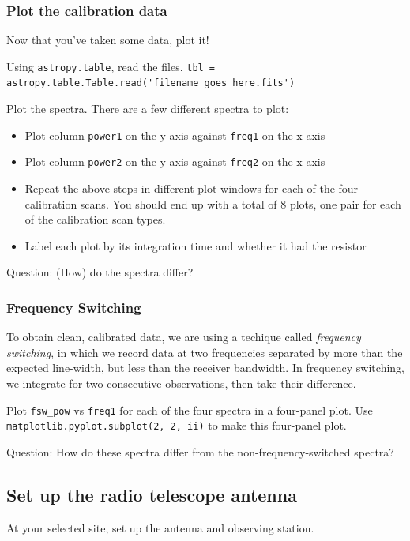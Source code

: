 \documentclass[11pt]{article}
\begin{document}
\subsubsection{Plot the calibration data}
Now that you've taken some data, plot it!

Using \texttt{astropy.table}, read the files.
\verb|tbl = astropy.table.Table.read('filename_goes_here.fits')|

Plot the spectra.  There are a few different spectra to plot:
\begin{itemize}
    \item Plot column \verb|power1| on the y-axis against \verb|freq1| on the x-axis
    \item Plot column \verb|power2| on the y-axis against \verb|freq2| on the x-axis
    \item Repeat the above steps in different plot windows for each of the four
        calibration scans.  You should end up with a total of 8 plots, one pair for
        each of the calibration scan types.
    \item Label each plot by its integration time and whether it had the resistor
\end{itemize}

Question: (How) do the spectra differ?

\subsubsection{Frequency Switching}
\label{sec:fsw}
To obtain clean, calibrated data, we are using a techique called \emph{frequency switching},
in which we record data at two frequencies separated by more than the expected line-width,
but less than the receiver bandwidth.  In frequency switching, we integrate for two consecutive
observations, then take their difference.

Plot \verb|fsw_pow| vs \verb|freq1| for each of the four spectra in a four-panel plot.
Use \verb|matplotlib.pyplot.subplot(2, 2, ii)| to make this four-panel plot.

Question: How do these spectra differ from the non-frequency-switched spectra?


\subsection{Set up the radio telescope antenna}
At your selected site, set up the antenna and observing station.
\end{document}
